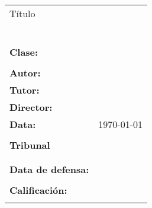 %
%
\thispagestyle{plain}
\section*{}


\begin{tabular}{p{2cm}p{11cm}}
	\large{Título} & \\
	& \textbf{\large{\titulogalego}} \\
	\\
	& \textbf{\large{\titulo}} \\
	\\
	& \textbf{\large{\tituloenglish}} \\
	\\
	\large{\textbf{Clase:}} & \large{\proyectotipo} \\
	\\
	\large{\textbf{Autor:}} & \large{\autor} \\
	\large{\textbf{Tutor:}} & \large{\tutor} \\
	\large{\textbf{Director:}} & \large{\director} \\
	\large{\textbf{Data:}} & \large{\today} \\
	\\
	\large{\textbf{Tribunal}} & \\
	& \vspace{3cm} \\
	\\
	\large{\textbf{Data de defensa:}} & \\
	\\
	\large{\textbf{Calificación:}} & \\
	\\
\end{tabular}
